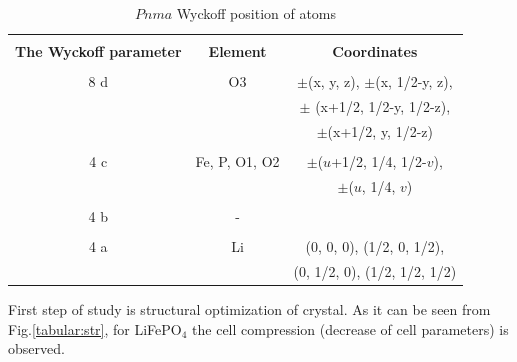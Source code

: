 \begin{table}[h]
\caption{$Pnma$ Wyckoff position of atoms}
\label{tabular:wyckoff}
\begin{center}
\begin{tabular}{|c|c|c|}
\hline
& & \\
 \textbf{The Wyckoff parameter} & \textbf{Element}  & \textbf{Coordinates}  \\
\hline
& & \\
8 d & O3 & $\pm$(x, y, z), $\pm$(x, 1/2-y, z), \\ 
  &  &  $\pm$ (x+1/2, 1/2-y, 1/2-z), \\
 &  &  $\pm$(x+1/2, y, 1/2-z)  \\
\hline
& & \\
4 c & Fe, P, O1, O2 & $\pm$($u$+1/2, 1/4, 1/2-$v$), \\
&  &   $\pm$($u$, 1/4, $v$) \\
\hline
& & \\
4 b & - & \\
\hline
& & \\
4 a & Li & (0, 0, 0), (1/2, 0, 1/2), \\
  &  &  (0, 1/2, 0), (1/2, 1/2, 1/2) \\
\hline
\end{tabular}
\end{center}
\end{table}


First step of study is structural optimization of crystal. As it can be seen from Fig.\ref{tabular:str}, for LiFePO$_4$ the cell compression (decrease of cell parameters) is observed. 

